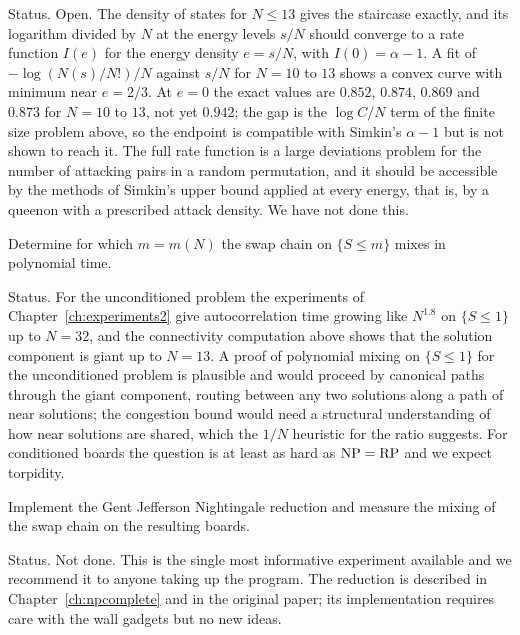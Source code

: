 Status. Open. The density of states for $N \le 13$ gives the staircase exactly, and its logarithm divided by $N$ at the energy levels $s/N$ should converge to a rate function $I(e)$ for the energy density $e = s/N$, with $I(0) = \alpha - 1$. A fit of $-\log(N(s)/N!) / N$ against $s/N$ for $N = 10$ to $13$ shows a convex curve with minimum near $e = 2/3$. At $e = 0$ the exact values are $0.852$, $0.874$, $0.869$ and $0.873$ for $N = 10$ to $13$, not yet $0.942$; the gap is the $\log C / N$ term of the finite size problem above, so the endpoint is compatible with Simkin's $\alpha - 1$ but is not shown to reach it. The full rate function is a large deviations problem for the number of attacking pairs in a random permutation, and it should be accessible by the methods of Simkin's upper bound applied at every energy, that is, by a queenon with a prescribed attack density. We have not done this.

\begin{problem}
Determine for which $m = m(N)$ the swap chain on $\{ S \le m \}$ mixes in polynomial time.
\end{problem}

Status. For the unconditioned problem the experiments of Chapter~\ref{ch:experiments2} give autocorrelation time growing like $N^{1.8}$ on $\{ S \le 1 \}$ up to $N = 32$, and the connectivity computation above shows that the solution component is giant up to $N = 13$. A proof of polynomial mixing on $\{ S \le 1 \}$ for the unconditioned problem is plausible and would proceed by canonical paths through the giant component, routing between any two solutions along a path of near solutions; the congestion bound would need a structural understanding of how near solutions are shared, which the $1/N$ heuristic for the ratio suggests. For conditioned boards the question is at least as hard as $\mathrm{NP} = \mathrm{RP}$ and we expect torpidity.

\begin{problem}
Implement the Gent Jefferson Nightingale reduction and measure the mixing of the swap chain on the resulting boards.
\end{problem}

Status. Not done. This is the single most informative experiment available and we recommend it to anyone taking up the program. The reduction is described in Chapter~\ref{ch:npcomplete} and in the original paper; its implementation requires care with the wall gadgets but no new ideas.

